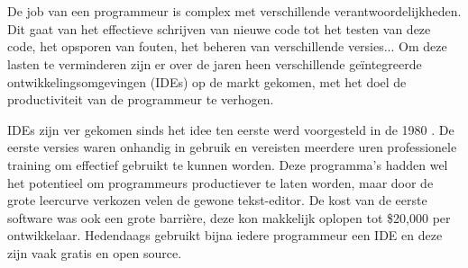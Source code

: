 


\chapter{}
\label{ch:inleiding}

De job van een programmeur is complex met verschillende verantwoordelijkheden. Dit gaat van het effectieve schrijven van nieuwe code tot het testen van deze code, het opsporen van fouten, het beheren van verschillende versies... Om deze lasten te verminderen zijn er over de jaren heen verschillende geïntegreerde ontwikkelingsomgevingen (IDEs) op de markt gekomen, met het doel de productiviteit van de programmeur te verhogen. 

IDEs zijn ver gekomen sinds het idee ten eerste werd voorgesteld in de 1980 \autocite{Kline2005}. De eerste versies waren onhandig in gebruik en vereisten meerdere uren professionele training om effectief gebruikt te kunnen worden. Deze programma's hadden wel het potentieel om programmeurs productiever te laten worden, maar door de grote leercurve verkozen velen de gewone tekst-editor. De kost van de eerste software was ook een grote barrière, deze kon makkelijk oplopen tot \$20,000 per ontwikkelaar. Hedendaags gebruikt bijna iedere programmeur een IDE en deze zijn vaak gratis en open source.

